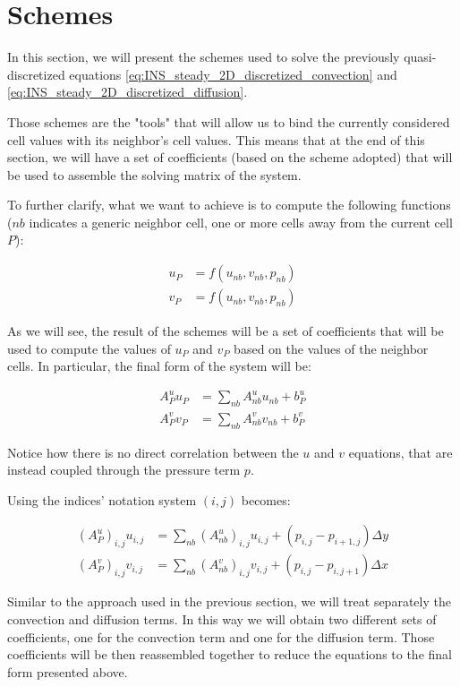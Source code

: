 \section{Schemes}
\label{sec:schemes}

In this section, we will present the schemes used to solve the previously quasi-discretized equations \ref{eq:INS_steady_2D_discretized_convection} and \ref{eq:INS_steady_2D_discretized_diffusion}.

Those schemes are the "tools" that will allow us to bind the currently considered cell values with its neighbor's cell values.
This means that at the end of this section, we will have a set of coefficients (based on the scheme adopted) that will be used to assemble the solving matrix of the system.

To further clarify, what we want to achieve is to compute the following functions ($nb$ indicates a generic neighbor cell, one or more cells away from the current cell $P$):

\begin{align}
    u_P & = f(u_{nb}, v_{nb}, p_{nb}) \\
    v_P & = f(u_{nb}, v_{nb}, p_{nb})
\end{align}

As we will see, the result of the schemes will be a set of coefficients that will be used to compute the values of $u_P$ and $v_P$ based on the values of the neighbor cells.
In particular, the final form of the system will be:

\begin{align}
    A_P^u u_P & = \sum_{nb} A_{nb}^u u_{nb} + b_P^u \\
    A_P^v v_P & = \sum_{nb} A_{nb}^v v_{nb} + b_P^v
    \label{eq:coefficients_form_system}
\end{align}

Notice how there is no direct correlation between the $u$ and $v$ equations, that are instead coupled through the pressure term $p$.

Using the indices' notation system $(i,j)$ becomes:

\begin{align}
    (A_P^u)_{i,j} u_{i,j} & = \sum_{nb} (A_{nb}^u)_{i,j} u_{i,j} + (p_{i,j} - p_{i+1,j}) \Delta y \\
    (A_P^v)_{i,j} v_{i,j} & = \sum_{nb} (A_{nb}^v)_{i,j} v_{i,j} + (p_{i,j} - p_{i,j+1}) \Delta x
\end{align}

Similar to the approach used in the previous section, we will treat separately the convection and diffusion terms.
In this way we will obtain two different sets of coefficients, one for the convection term and one for the diffusion term.
Those coefficients will be then reassembled together to reduce the equations to the final form presented above.

